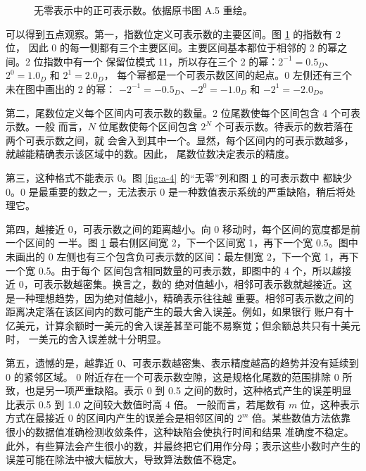 \begin{figure}[htbp]
  \centering
  \caption{无零表示中的正可表示数。依据原书图 A.5 重绘。}
  \label{fig:a-5}
\end{figure}

可以得到五点观察。第一，指数位定义可表示数的主要区间。图 \ref{fig:a-5} 的指数有 2 位，
因此 0 的每一侧都有三个主要区间。主要区间基本都位于相邻的 2 的幂之间。2 位指数中有一个
保留位模式 11，所以存在三个 2 的幂：$2^{-1}=0.5_D$、$2^0=1.0_D$ 和 $2^1=2.0_D$，
每个幂都是一个可表示数区间的起点。0 左侧还有三个未在图中画出的 2 的幂：
$-2^{-1}=-0.5_D$、$-2^0=-1.0_D$ 和 $-2^1=-2.0_D$。

第二，尾数位定义每个区间内可表示数的数量。2 位尾数使每个区间包含 4 个可表示数。一般
而言，$N$ 位尾数使每个区间包含 $2^N$ 个可表示数。待表示的数若落在两个可表示数之间，就
会舍入到其中一个。显然，每个区间内的可表示数越多，就越能精确表示该区域中的数。因此，
尾数位数决定表示的精度。

第三，这种格式不能表示 0。图 \ref{fig:a-4} 的“无零”列和图 \ref{fig:a-5} 的可表示数中
都缺少 0。0 是最重要的数之一，无法表示 0 是一种数值表示系统的严重缺陷，稍后将处理它。

第四，越接近 0，可表示数之间的距离越小。向 0 移动时，每个区间的宽度都是前一个区间的
一半。图 \ref{fig:a-5} 最右侧区间宽 2，下一个区间宽 1，再下一个宽 0.5。图中未画出的
0 左侧也有三个包含负可表示数的区间：最左侧宽 2，下一个宽 1，再下一个宽 0.5。由于每个
区间包含相同数量的可表示数，即图中的 4 个，所以越接近 0，可表示数越密集。换言之，数的
绝对值越小，相邻可表示数就越接近。这是一种理想趋势，因为绝对值越小，精确表示往往越
重要。相邻可表示数之间的距离决定落在该区间内的数可能产生的最大舍入误差。例如，如果银行
账户有十亿美元，计算余额时一美元的舍入误差甚至可能不易察觉；但余额总共只有十美元时，
一美元的舍入误差就十分明显。

第五，遗憾的是，越靠近 0、可表示数越密集、表示精度越高的趋势并没有延续到 0 的紧邻区域。
0 附近存在一个可表示数空隙，这是规格化尾数的范围排除 0 所致，也是另一项严重缺陷。表示
0 到 0.5 之间的数时，这种格式产生的误差明显比表示 0.5 到 1.0 之间较大数值时高 4 倍。
一般而言，若尾数有 $m$ 位，这种表示方式在最接近 0 的区间内产生的误差会是相邻区间的
$2^m$ 倍。某些数值方法依靠很小的数据值准确检测收敛条件，这种缺陷会使执行时间和结果
准确度不稳定。此外，有些算法会产生很小的数，并最终把它们用作分母；表示这些小数时产生的
误差可能在除法中被大幅放大，导致算法数值不稳定。

